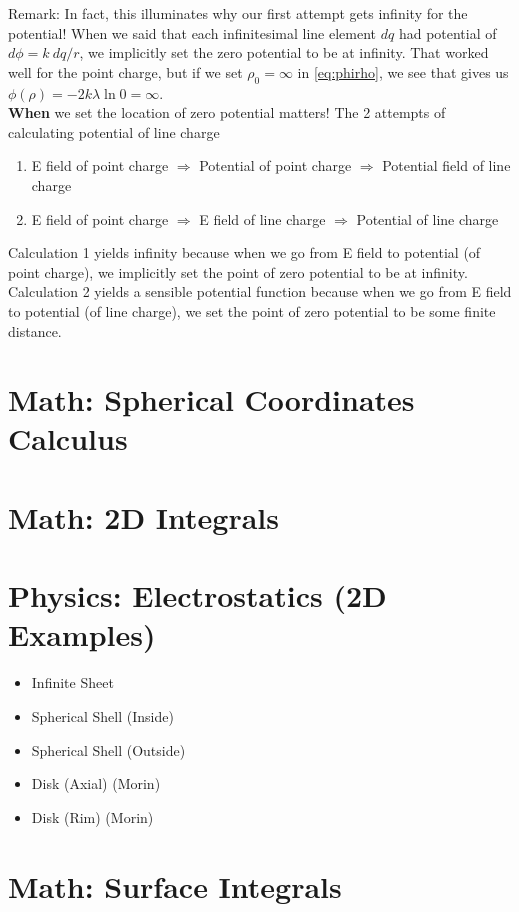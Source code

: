 \documentclass{article}
\begin{document}
Remark: In fact, this illuminates why our first attempt gets infinity for the potential! When we said that each infinitesimal line element $dq$ had potential of $d\phi = k\ dq / r$, we implicitly set the zero potential to be at infinity. That worked well for the point charge, but if we set $\rho_0=\infty$ in \ref{eq:phirho}, we see that gives us $\phi(\rho) = -2k \lambda \ln 0 = \infty$. \\[10pt]
\textbf{When} we set the location of zero potential matters! The 2 attempts of calculating potential of line charge
\begin{enumerate}
    \item E field of point charge $\Rightarrow$ Potential of point charge $\Rightarrow$ Potential field of line charge
    \item E field of point charge $\Rightarrow$ E field of line charge $\Rightarrow$ Potential of line charge
\end{enumerate}
Calculation 1 yields infinity because when we go from E field to potential (of point charge), we implicitly set the point of zero potential to be at infinity. \\[10pt]
Calculation 2 yields a sensible potential function because when we go from E field to potential (of line charge), we set the point of zero potential to be some finite distance.
\section{Math: Spherical Coordinates Calculus}
\section{Math: 2D Integrals}
\section{Physics: Electrostatics (2D Examples)}
\begin{itemize}
    \item Infinite Sheet 
    \item Spherical Shell (Inside)
    \item Spherical Shell (Outside)
    \item Disk (Axial) (Morin)
    \item Disk (Rim) (Morin)
\end{itemize}
\section{Math: Surface Integrals}
\end{document}
